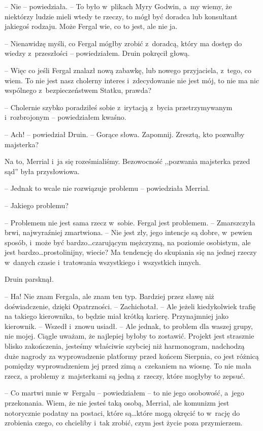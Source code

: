 \documentclass[oneside,polish,11pt,sfheadings]{mwbk}
\begin{document}
-- Nie -- powiedziała. -- To było w~plikach Myry Godwin, a~my wiemy, że
niektórzy ludzie mieli wtedy te rzeczy, to mógł być doradca lub
konsultant jakiegoś rodzaju. Może Fergal wie, co to jest, ale nie ja.

-- Nienawidzę myśli, co Fergal mógłby zrobić z~doradcą, który ma dostęp
do wiedzy z~przeszłości -- powiedziałem. Druin pokręcił głową.

-- Więc co jeśli Fergal znalazł nową zabawkę, lub nowego przyjaciela, z~tego, co wiem. To nie jest nasz cholerny interes i~zdecydowanie nie jest
mój, to nie ma nic wspólnego z~bezpieczeństwem Statku, prawda?

-- Cholernie szybko poradziłeś sobie z~irytacją z~bycia przetrzymywanym i~rozbrojonym -- powiedziałem kwaśno.

-- Ach! -- powiedział Druin. -- Gorące słowa. Zapomnij. Zresztą, kto
pozwałby majsterka?

Na to, Merrial i~ja się roześmialiśmy. Bezowocność ,,pozwania majsterka
przed sąd'' była przysłowiowa.

-- Jednak to wcale nie rozwiązuje problemu -- powiedziała Merrial.

-- Jakiego problemu?

-- Problemem nie jest sama rzecz w~sobie. Fergal jest problemem. -- Zmarszczyła brwi, najwyraźniej zmartwiona. -- Nie jest zły, jego intencje
są dobre, w~pewien sposób, i~może być bardzo\ldots czarującym mężczyzną, na
poziomie osobistym, ale jest bardzo\ldots prostolinijny, wiecie? Ma
tendencję do skupiania się na jednej rzeczy w~danych czasie i~tratowania
wszystkiego i~wszystkich innych.

Druin parsknął. 

-- Ha! Nie znam Fergala, ale znam ten typ. Bardziej przez
sławę niż doświadczenie, dzięki Opatrzności. -- Zachichotał. -- Ale jeżeli
kiedykolwiek trafię na takiego kierownika, to będzie miał krótką
karierę. Przynajmniej jako kierownik. -- Wszedł i~znowu usiadł. -- Ale
jednak, to problem dla waszej grupy, nie mojej. Ciągle uważam, że
najlepiej byłoby to zostawić. Projekt jest strasznie blisko zakończenia,
jesteśmy właściwie szybciej niż harmonogram, nadchodzą duże nagrody za
wyprowadzenie platformy przed końcem Sierpnia, co jest różnicą pomiędzy
wyprowadzeniem jej przed zimą a~czekaniem na wiosnę. To nie mała rzecz,
a problemy z~majsterkami są jedną z~rzeczy, które mogłyby to zepsuć.

-- Co martwi mnie w~Fergalu -- powiedziałem -- to nie jego osobowość, a~jego przekonania. Wiem, że nie jesteś taką osobą, Merrial, ale komunizm
jest notorycznie podatny na postaci, które są\ldots które mogą okręcić to w~rację do zrobienia czego, co chcieliby i~tak zrobić, czym jest życie
poza przymierzem.
\end{document}
